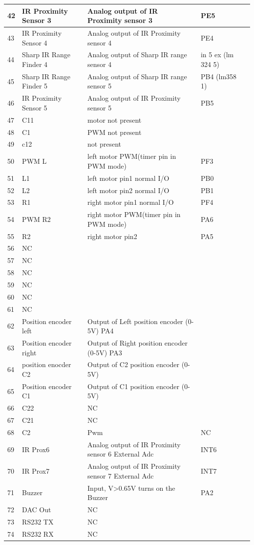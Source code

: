 \documentclass[a4paper,12pt,oneside]{article}
\begin{document}
{\begin{longtable}{|p{}|p{}|p{}|p{}|p{}|}
				42&	IR Proximity Sensor 3&	Analog output of IR Proximity sensor 3	&PE5\\ \hline
				43&	IR Proximity Sensor 4&	Analog output of IR Proximity sensor 4&	PE4\\ \hline
				44&	Sharp IR Range Finder 4	&Analog output of Sharp IR range sensor 4&	in 5 ex (lm 324 5)\\ \hline
				45&	Sharp IR Range Finder 5&	Analog output of Sharp IR range sensor 5&	PB4 (lm358 1)\\ \hline
				46&	IR Proximity Sensor 5&	Analog output of IR Proximity sensor 5&	PB5\\ \hline
				47&	C11& motor 	not present&	\\ \hline
				48&	C1 &PWM	not present	&\\ \hline
				49&	c12&	not present	&\\ \hline
				50&	PWM L&	left motor PWM(timer pin in PWM mode)&	PF3\\ \hline
				51&	L1&	left motor pin1 normal I/O&	PB0\\ \hline
				52&	L2&	left motor pin2 normal I/O&	PB1\\ \hline
				53&	R1&	right motor pin1 normal I/O&	PF4\\ \hline
				54&	PWM R2&	right motor PWM(timer pin in PWM  mode)&	PA6\\ \hline
				55&	R2&	right motor pin2&	PA5\\ \hline
				56&	NC&&	\\ \hline	
				57&	NC&&	\\ \hline	
				58&	NC&&	\\ \hline	
				59&	NC&&	\\ \hline	
				60&	NC&&	\\ \hline	
				61&	NC	&&	\\ \hline
				62&	Position encoder left&	Output of Left position encoder (0-5V)	PA4&&\\ \hline
				63&	Position encoder right& 	Output of Right position encoder (0-5V)	PA3&&\\ \hline
				64&	position enocder C2&	Output of C2 position encoder (0-5V)&&	\\ \hline
				65&	Position encoder C1& Output of C1 position encoder (0-5V)&&	\\ \hline
				66&	C22&	NC&	\\ \hline
				67&	C21	& NC&	\\ \hline
				68&	C2&Pwm&	NC	\\ \hline
				69&	IR Prox6&	Analog output of IR Proximity sensor 6	External Adc &INT6\\ \hline
				70&	IR Prox7&	Analog output of IR Proximity sensor 7	External Adc &INT7\\ \hline
				71&	Buzzer&	Input, V>0.65V turns on the Buzzer&	PA2\\ \hline
				72&	DAC Out&	NC&	\\ \hline
				73&	RS232 TX&	NC&	\\ \hline
				74&	RS232 RX&	NC&	\\ \hline


\end{longtable}}
\end{document}
